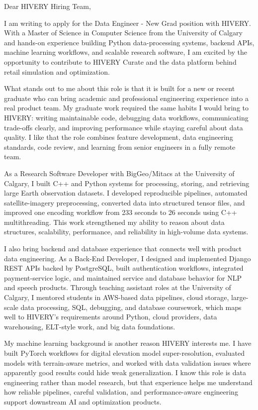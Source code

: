 \documentclass[11pt]{letter}
\begin{document}
\begin{letter}{}

\opening{Dear HIVERY Hiring Team,}

I am writing to apply for the Data Engineer - New Grad position with HIVERY. With a Master of Science in Computer Science from the University of Calgary and hands-on experience building Python data-processing systems, backend APIs, machine learning workflows, and scalable research software, I am excited by the opportunity to contribute to HIVERY Curate and the data platform behind retail simulation and optimization.

What stands out to me about this role is that it is built for a new or recent graduate who can bring academic and professional engineering experience into a real product team. My graduate work required the same habits I would bring to HIVERY: writing maintainable code, debugging data workflows, communicating trade-offs clearly, and improving performance while staying careful about data quality. I like that the role combines feature development, data engineering standards, code review, and learning from senior engineers in a fully remote team.

As a Research Software Developer with BigGeo/Mitacs at the University of Calgary, I built C++ and Python systems for processing, storing, and retrieving large Earth observation datasets. I developed reproducible pipelines, automated satellite-imagery preprocessing, converted data into structured tensor files, and improved one encoding workflow from 233 seconds to 26 seconds using C++ multithreading. This work strengthened my ability to reason about data structures, scalability, performance, and reliability in high-volume data systems.

I also bring backend and database experience that connects well with product data engineering. As a Back-End Developer, I designed and implemented Django REST APIs backed by PostgreSQL, built authentication workflows, integrated payment-service logic, and maintained service and database behavior for NLP and speech products. Through teaching assistant roles at the University of Calgary, I mentored students in AWS-based data pipelines, cloud storage, large-scale data processing, SQL, debugging, and database coursework, which maps well to HIVERY's requirements around Python, cloud providers, data warehousing, ELT-style work, and big data foundations.

My machine learning background is another reason HIVERY interests me. I have built PyTorch workflows for digital elevation model super-resolution, evaluated models with terrain-aware metrics, and worked with data validation issues where apparently good results could hide weak generalization. I know this role is data engineering rather than model research, but that experience helps me understand how reliable pipelines, careful validation, and performance-aware engineering support downstream AI and optimization products.


\end{letter}
\end{document}
